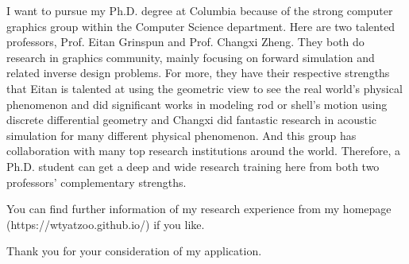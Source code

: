 \documentclass[a4paper,12pt]{article}
\begin{document}
I want to pursue my Ph.D. degree at Columbia because of the strong computer graphics group within the Computer Science department. Here are two talented professors, Prof. Eitan Grinspun and Prof. Changxi Zheng. They both do research in graphics community, mainly focusing on forward simulation and related inverse design problems. For more, they have their respective strengths that Eitan is talented at using the geometric view to see the real world's physical phenomenon and did significant works in modeling rod or shell's motion using discrete differential geometry and Changxi did fantastic research in acoustic simulation for many different physical phenomenon. And this group has collaboration with many top research institutions around the world. Therefore, a Ph.D. student can get a deep and wide research training here from both two professors' complementary strengths.\vspace{1.2ex} 

You can find further information of my research experience from my homepage\\(https://wtyatzoo.github.io/) if you like.\vspace{1.2ex}

Thank you for your consideration of my application.

\vspace{1.2ex}
\end{document}
